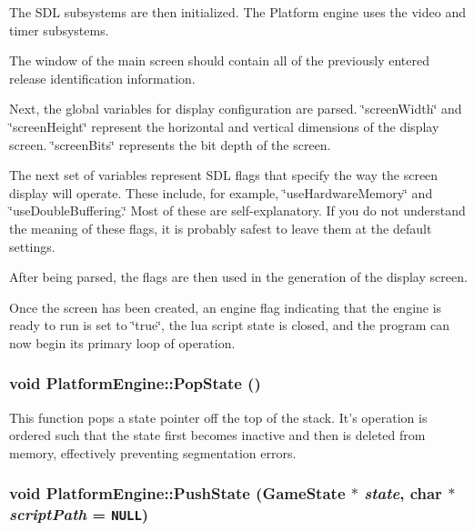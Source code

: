 The SDL subsystems are then initialized. The Platform engine uses the video and timer subsystems.

The window of the main screen should contain all of the previously entered release identification information.

Next, the global variables for display configuration are parsed. \char`\"{}screenWidth\char`\"{} and \char`\"{}screenHeight\char`\"{} represent the horizontal and vertical dimensions of the display screen. \char`\"{}screenBits\char`\"{} represents the bit depth of the screen.

The next set of variables represent SDL flags that specify the way the screen display will operate. These include, for example, \char`\"{}useHardwareMemory\char`\"{} and \char`\"{}useDoubleBuffering.\char`\"{} Most of these are self-explanatory. If you do not understand the meaning of these flags, it is probably safest to leave them at the default settings.

After being parsed, the flags are then used in the generation of the display screen.

Once the screen has been created, an engine flag indicating that the engine is ready to run is set to \char`\"{}true\char`\"{}, the lua script state is closed, and the program can now begin its primary loop of operation.\hypertarget{class_platform_engine_cf001abec596906465197d1220db2230}{
\subsubsection[{PopState}]{\setlength{\rightskip}{0pt plus 5cm}void PlatformEngine::PopState ()}}
\label{db/da1/class_platform_engine_cf001abec596906465197d1220db2230}


This function pops a state pointer off the top of the stack. It's operation is ordered such that the state first becomes inactive and then is deleted from memory, effectively preventing segmentation errors. \hypertarget{class_platform_engine_0a2f800d7b8a54f2e3792bc99507c632}{
\subsubsection[{PushState}]{\setlength{\rightskip}{0pt plus 5cm}void PlatformEngine::PushState ({\bf GameState} $\ast$ {\em state}, \/  char $\ast$ {\em scriptPath} = {\tt NULL})}}
\label{db/da1/class_platform_engine_0a2f800d7b8a54f2e3792bc99507c632}


